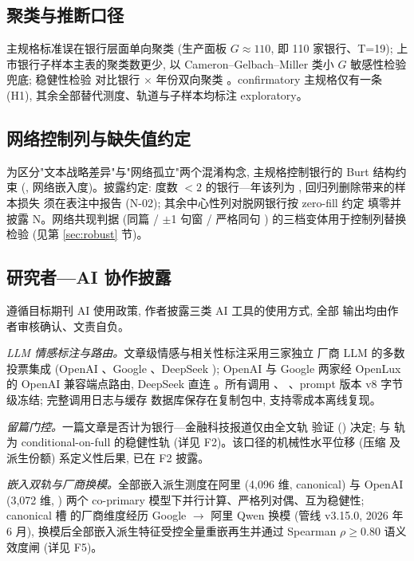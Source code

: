 \subsection{聚类与推断口径}\label{sec:method-cluster}
主规格标准误在银行层面单向聚类 (生产面板 $G\approx110$,
即 110 家银行、T=19); 上市银行子样本主表的聚类数更少, 以
Cameron--Gelbach--Miller 类小 $G$ 敏感性检验兜底; 稳健性检验
对比银行 $\times$ 年份双向聚类
\parencite{cameron2015practitioner}。confirmatory 主规格仅有一条
(H1), 其余全部替代测度、轨道与子样本均标注 exploratory。

\subsection{网络控制列与缺失值约定}\label{sec:method-network}
为区分"文本战略差异"与"网络孤立"两个混淆构念, 主规格控制银行的
Burt 结构约束 (, 网络嵌入度)。披露约定:
度数 $<2$ 的银行—年该列为 , 回归列删除带来的样本损失
须在表注中报告 (N-02); 其余中心性列对脱网银行按 zero-fill 约定
填零并披露 N。网络共现判据 (同篇 / $\pm$1 句窗  /
严格同句 ) 的三档变体用于控制列替换检验
(见第 \ref{sec:robust} 节)。

\subsection{研究者—AI 协作披露}\label{sec:method-ai}
遵循目标期刊 AI 使用政策, 作者披露三类 AI 工具的使用方式, 全部
输出均由作者审核确认、文责自负。

\emph{LLM 情感标注与路由。}文章级情感与相关性标注采用三家独立
厂商 LLM 的多数投票集成 (OpenAI 、Google
、DeepSeek );
OpenAI 与 Google 两家经 OpenLux 的 OpenAI 兼容端点路由, DeepSeek
直连 。所有调用 、
、prompt 版本 v8 字节级冻结; 完整调用日志与缓存
数据库保存在复制包中, 支持零成本离线复现。

\emph{留篇门控。}一篇文章是否计为银行—金融科技报道仅由全文轨
验证 () 决定;  与  轨为
conditional-on-full 的稳健性轨 (详见 F2)。该口径的机械性水平位移
(压缩  及派生份额) 系定义性后果, 已在 F2 披露。

\emph{嵌入双轨与厂商换模。}全部嵌入派生测度在阿里
 (4{,}096 维, canonical) 与 OpenAI
 (3{,}072 维, ) 两个
co-primary 模型下并行计算、严格列对偶、互为稳健性; canonical 槽
的厂商维度经历 Google $\to$ 阿里 Qwen 换模 (管线 v3.15.0, 2026 年
6 月), 换模后全部嵌入派生特征受控全量重嵌再生并通过 Spearman
$\rho\geq0.80$ 语义效度闸 (详见 F5)。

